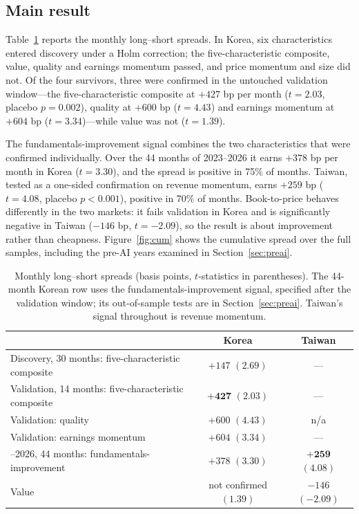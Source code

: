 \documentclass[12pt,a4paper]{article}
\begin{document}
\subsection{Main result}\label{sec:main}

Table~\ref{tab:main} reports the monthly long--short spreads. In Korea, six characteristics entered discovery under a
Holm correction; the five-characteristic composite, value, quality and earnings momentum passed, and price momentum and size did
not. Of the four survivors, three were confirmed in the untouched validation window---the five-characteristic composite at
$+427$ bp per month ($t=2.03$, placebo $p=0.002$), quality at $+600$ bp ($t=4.43$) and earnings momentum at $+604$ bp
($t=3.34$)---while value was not ($t=1.39$).

The fundamentals-improvement signal combines the two characteristics that were confirmed individually. Over the 44
months of 2023--2026 it earns $+378$ bp per month in Korea ($t=3.30$), and the spread is positive in 75\% of months.
Taiwan, tested as a one-sided confirmation on revenue momentum, earns $+259$ bp ($t=4.08$, placebo $p<0.001$), positive
in 70\% of months. Book-to-price behaves differently in the two markets: it fails validation in Korea and is
significantly negative in Taiwan ($-146$ bp, $t=-2.09$), so the result is about improvement rather than cheapness.
Figure~\ref{fig:cum} shows the cumulative spread over the full samples, including the pre-AI years examined in
Section~\ref{sec:preai}.

\begin{table}[!htbp]
\centering
\caption{Monthly long--short spreads (basis points, $t$-statistics in parentheses). The 44-month Korean row uses the
fundamentals-improvement signal, specified after the validation window; its out-of-sample tests are in
Section~\ref{sec:preai}. Taiwan's signal throughout is revenue momentum.}
\label{tab:main}
\small
\begin{tabularx}{\textwidth}{@{}>{\raggedright\arraybackslash}X c c@{}}
\toprule
& Korea & Taiwan \\
\midrule
Discovery, 30 months: five-characteristic composite & $+147$ $(2.69)$ & --- \\
Validation, 14 months: five-characteristic composite & $\mathbf{+427}$ $(2.03)$ & --- \\
Validation: quality & $+600$ $(4.43)$ & n/a \\
Validation: earnings momentum & $+604$ $(3.34)$ & --- \\
2023--2026, 44 months: fundamentals-improvement & $+378$ $(3.30)$ & $\mathbf{+259}$ $(4.08)$ \\
Value & not confirmed $(1.39)$ & $-146$ $(-2.09)$ \\
\bottomrule
\end{tabularx}
\end{table}
\end{document}
